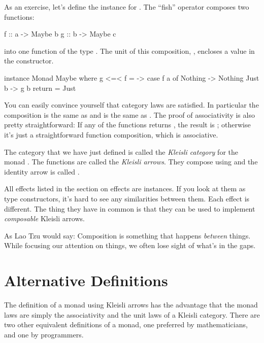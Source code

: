 \documentclass[DaoFP]{subfiles}
\begin{document}
As an exercise, let's define the  instance for . The ``fish'' operator \hask{<=<} composes two functions:
\begin{haskell}
f :: a -> Maybe b
g :: b -> Maybe c
\end{haskell}
into one function of the type . The unit of this composition, , encloses a value in the  constructor.
\begin{haskell}
instance Monad Maybe where
  g <=< f = \a -> case f a of
                    Nothing -> Nothing
                    Just b -> g b
  return = Just  
\end{haskell}

You can easily convince yourself that category laws are satisfied. In particular the composition  is the same as  and  is the same as . The proof of associativity is also pretty straightforward: If any of the functions returns , the result is ; otherwise it's just a straightforward function composition, which is associative.

The category that we have just defined is called the \emph{Kleisli category} for the monad . The functions  are called the \emph{Kleisli arrows}. They compose using \hask{<=<} and the identity arrow is called .

All effects listed in the section on effects are  instances. If you look at them as type constructors, it's hard to see any similarities between them. Each effect is different. The thing they have in common is that they can be used to implement \emph{composable} Kleisli arrows. 

As Lao Tzu would say: Composition is something that happens \emph{between} things. While focusing our attention on things, we often lose sight of what's in the gaps. 

\section{Alternative Definitions}

The definition of a monad using Kleisli arrows has the advantage that the monad laws are simply the associativity and the unit laws of a Kleisli category. There are two other equivalent definitions of a monad, one preferred by mathematicians, and one by programmers. 
\end{document}
